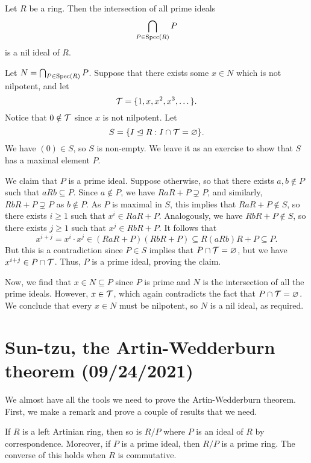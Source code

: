 \begin{theo}{}
Let $R$ be a ring. Then the intersection of all prime ideals 
\[ \bigcap_{P \in \operatorname{Spec}(R)} P \]
is a nil ideal of $R$. 
\end{theo}
\begin{pf}
Let $N = \bigcap_{P \in \operatorname{Spec}(R)} P$. Suppose that there exists some $x \in N$ which is not nilpotent,
and let 
\[ {\cal T} = \{1, x, x^2, x^3, \dots \}. \]
Notice that $0 \notin {\cal T}$ since $x$ is not nilpotent. Let 
\[ S = \{I \trianglelefteq R : I \cap {\cal T} = \varnothing\}. \]
We have $(0) \in S$, so $S$ is non-empty. We leave it as an exercise to show that $S$ has a maximal 
element $P$. 

We claim that $P$ is a prime ideal. Suppose otherwise, so that there exists $a, b \notin P$ 
such that $aRb \subseteq P$. Since $a \notin P$, we have $RaR + P \supsetneq P$, and similarly, 
$RbR + P \supsetneq P$ as $b \notin P$. As $P$ is maximal in $S$, this implies that 
$RaR + P \notin S$, so there exists $i \geq 1$ such that $x^i \in RaR + P$. 
Analogously, we have $RbR + P \notin S$, so there exists $j \geq 1$ such that $x^j \in RbR + P$. 
It follows that 
\[ x^{i+j} = x^i \cdot x^j \in (RaR + P)(RbR + P) \subseteq R(aRb)R + P \subseteq P. \]
But this is a contradiction since $P \in S$ implies that 
$P \cap {\cal T} = \varnothing$, but we have $x^{i+j} \in P \cap {\cal T}$. 
Thus, $P$ is a prime ideal, proving the claim. 

Now, we find that $x \in N \subseteq P$ since $P$ is prime and $N$ is the intersection of all 
the prime ideals. However, $x \in {\cal T}$, which again contradicts the fact that 
$P \cap {\cal T} = \varnothing$. We conclude that every $x \in N$ must be nilpotent, so 
$N$ is a nil ideal, as required.
\end{pf}

\section{Sun-tzu, the Artin-Wedderburn theorem (09/24/2021)}
We almost have all the tools we need to prove the Artin-Wedderburn theorem. 
First, we make a remark and prove a couple of results that we need. 

\begin{remark}{}
If $R$ is a left Artinian ring, then so is $R/P$ where $P$ is an ideal of $R$ by correspondence. 
Moreover, if $P$ is a prime ideal, then $R/P$ is a prime ring. The converse of this holds when 
$R$ is commutative. 
\end{remark}

